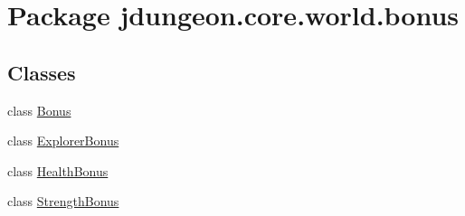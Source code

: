 \hypertarget{namespacejdungeon_1_1core_1_1world_1_1bonus}{
\section{Package jdungeon.core.world.bonus}
\label{namespacejdungeon_1_1core_1_1world_1_1bonus}
}
\subsection*{Classes}
\begin{DoxyCompactItemize}
\item 
class \hyperlink{classjdungeon_1_1core_1_1world_1_1bonus_1_1_bonus}{Bonus}
\item 
class \hyperlink{classjdungeon_1_1core_1_1world_1_1bonus_1_1_explorer_bonus}{ExplorerBonus}
\item 
class \hyperlink{classjdungeon_1_1core_1_1world_1_1bonus_1_1_health_bonus}{HealthBonus}
\item 
class \hyperlink{classjdungeon_1_1core_1_1world_1_1bonus_1_1_strength_bonus}{StrengthBonus}
\end{DoxyCompactItemize}
